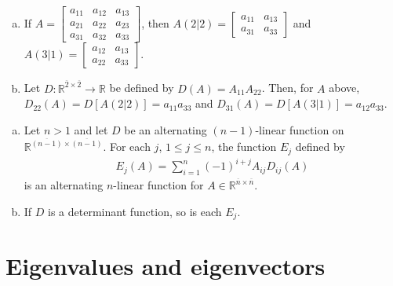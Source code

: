 \documentclass[12pt,letterpaper,reqno]{article}
\numberwithin{equation}{section}
\newcommand{\fixme}[1]{{\color{orange}{[#1]}}}
\begin{document}
\begin{example}
\begin{enumerate}[(a)]
	\item If $A=\begin{bmatrix}
		a_{11} & a_{12} & a_{13} \\
		a_{21} & a_{22} & a_{23} \\
		a_{31} & a_{32} & a_{33}
	\end{bmatrix}$, then $A(2|2)=\begin{bmatrix}
		a_{11} & a_{13} \\
		a_{31} & a_{33}
	\end{bmatrix}$ and $A(3|1)=\begin{bmatrix}
		a_{12} & a_{13} \\
		a_{22} & a_{33}
	\end{bmatrix}$.	
	\item Let $D:\mathbb{R}^{\overline{2} \times \overline{2}}\to \mathbb{R}$ be defined by $D(A)=A_{11}A_{22}$. Then, for $A$ above, $D_{22}(A)=D[A(2\vert 2)]=a_{11}a_{33}$ and $D_{31}(A)=D[A(3\vert 1)]=a_{12}a_{33}$.
\end{enumerate}
\end{example}


\begin{thm}[\fixme{Need label.}]
\begin{enumerate}[(a)] \hspace{10cm}
	\item Let $n>1$ and let $D$ be an alternating $(n-1)$-linear function on $\mathbb{R}^{\overline{(n-1)} \times \overline{(n-1)}}$. For each $j$, $1 \leq j \leq n$, the function $E_j$ defined by 
	\begin{align*}
		E_j(A)=\sum_{i=1}^n(-1)^{i+j}A_{ij}D_{ij}(A)
	\end{align*}
	is an alternating $n$-linear function for $A \in \mathbb{R}^{\overline{n} \times \overline{n}}$.
	\item If $D$ is a determinant function, so is each $E_j$.
\end{enumerate}
	
\end{thm}






\section{Eigenvalues and eigenvectors}

\begin{appendices}
\section{}	
\end{appendices}


\printbibliography
\nocite{*}
\end{document}
